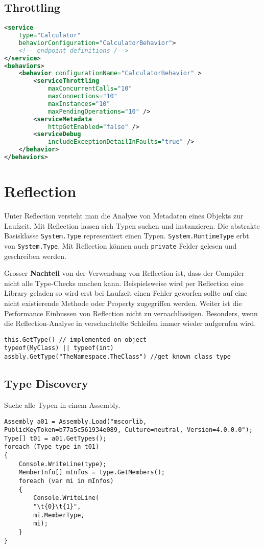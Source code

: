 \subsection{Throttling}
\begin{lstlisting}[caption=Service Throttling, language=XML]
<service
	type="Calculator"
	behaviorConfiguration="CalculatorBehavior">
	<!-- endpoint definitions /-->
</service>
<behaviors>
	<behavior configurationName="CalculatorBehavior" >
		<serviceThrottling
			maxConcurrentCalls="10"
			maxConnections="10"
			maxInstances="10"
			maxPendingOperations="10" />
		<serviceMetadata
			httpGetEnabled="false" />
		<serviceDebug
			includeExceptionDetailInFaults="true" />
	</behavior>
</behaviors>
\end{lstlisting}

\section{Reflection}
Unter Reflection versteht man die Analyse von Metadaten eines Objekts zur Laufzeit. Mit Reflection lassen sich Typen suchen und instanzieren. Die abstrakte Basisklasse \lstinline|System.Type| representiert einen Typen. \lstinline|System.RuntimeType| erbt von \lstinline|System.Type|. Mit Reflection können auch \lstinline|private| Felder gelesen und geschreiben werden.

Grosser \textbf{Nachteil} von der Verwendung von Reflection ist, dass der Compiler nicht alle Type-Checks machen kann. Beispielsweise wird per Reflection eine Library geladen so wird erst bei Laufzeit einen Fehler geworfen sollte auf eine nicht existierende Methode oder Property zugegriffen werden. Weiter ist die Performance Einbussen von Reflection nicht zu vernachlässigen. Besonders, wenn die Reflection-Analyse in verschachtelte Schleifen immer wieder aufgerufen wird.

\begin{lstlisting}[caption=Reflection]
this.GetType() // implemented on object
typeof(MyClass) || typeof(int)
assbly.GetType("TheNamespace.TheClass") //get known class type
\end{lstlisting}

\subsection{Type Discovery}
Suche alle Typen in einem Assembly.
\begin{lstlisting}[caption=Reflection: Type Discovery]
Assembly a01 = Assembly.Load("mscorlib, PublicKeyToken=b77a5c561934e089, Culture=neutral, Version=4.0.0.0");
Type[] t01 = a01.GetTypes();
foreach (Type type in t01)
{
	Console.WriteLine(type);
	MemberInfo[] mInfos = type.GetMembers();
	foreach (var mi in mInfos)
	{
		Console.WriteLine(
		"\t{0}\t{1}",
		mi.MemberType,
		mi);
	}
}
\end{lstlisting}


